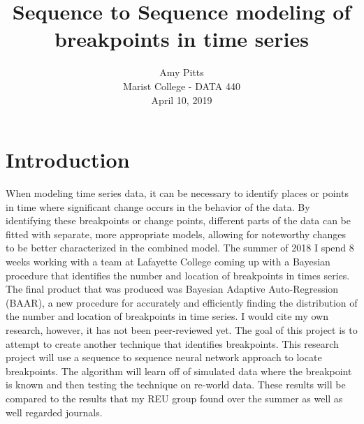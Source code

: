 \documentclass[12pt]{article}
\begin{document}
 
 
\title{\textbf{Sequence to Sequence modeling of breakpoints in time series }}
\date{}

\author{
        Amy Pitts \\
        Marist College - DATA 440 \\
        April 10, 2019
 }

\maketitle

\begin{abstract}

\end{abstract} \hspace{10pt}
\thispagestyle{empty}
\clearpage
\setcounter{page}{1}


\section{Introduction}
When modeling time series data, it can be necessary to identify places or points in time where significant change occurs in the behavior of the data. By identifying these breakpoints or change points, different parts of the data can be fitted with separate, more appropriate models, allowing for noteworthy changes to be better characterized in the combined model. The summer of 2018 I spend 8 weeks working with a team at Lafayette College coming up with a Bayesian procedure that identifies the number and location of breakpoints in times series. The final product that was produced was Bayesian Adaptive Auto-Regression (BAAR), a new procedure for accurately and efficiently finding the distribution of the number and location of breakpoints in time series. I would cite my own research, however, it has not been peer-reviewed yet. The goal of this project is to attempt to create another technique that identifies breakpoints. This research project will use a sequence to sequence neural network approach to locate breakpoints. The algorithm will learn off of simulated data where the breakpoint is known and then testing the technique on re-world data. These results will be compared to the results that my REU group found over the summer as well as well regarded journals. 
\end{document}
